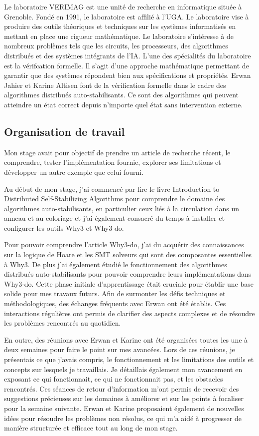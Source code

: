 \documentclass[11pt]{article}
\begin{document}
   Le laboratoire VERIMAG est une unité de recherche en informatique située à Grenoble. Fondé
en 1991, le laboratoire est affilié à l’UGA. Le laboratoire vise à produire des outils théoriques
et techniques sur les systèmes informatisés en mettant en place une rigueur mathématique.
Le laboratoire s'intéresse à  de nombreux problèmes tels que les circuits, les processeurs, des algorithmes distribués et des systèmes intégrants de l’IA.
L’une des spécialités du laboratoire est la vérifcation formelle. Il s’agit d’une approche
mathématique permettant de garantir que des systèmes répondent bien aux spécifications
et propriétés. Erwan Jahier et Karine Altisen font de la vérification formelle dans le 
cadre des algorithmes distribués auto-stabilisants. Ce sont des algorithmes qui peuvent 
atteindre un état correct depuis n'importe quel état sans intervention externe.


\subsection{Organisation de travail}
\label{sec:orgffca747}

Mon stage avait pour objectif de prendre un article de recherche récent, le comprendre, tester l’implémentation fournie, 
explorer ses limitations et développer un autre exemple que celui fourni. 

Au début de mon stage, j'ai commencé par lire le livre Introduction to Distributed Self-Stabilizing Algorithms pour comprendre le domaine des algorithmes auto-stabilisants, 
en particulier ceux liés à la circulation dans un anneau et au coloriage et j'ai également consacré du temps à installer et configurer les outils Why3 et Why3-do.  

Pour pouvoir comprendre l'article Why3-do, j'ai du acquérir des connaissances sur la logique de Hoare et les SMT solveurs qui sont des composantes essentielles à Why3.
De plus j'ai également étudié le fonctionnement des algorithmes distribués auto-stabilisants pour pouvoir comprendre leurs implémentations dans Why3-do.
Cette phase initiale d'apprentissage était cruciale pour établir une base solide pour mes travaux futurs. 
Afin de surmonter les défis techniques et méthodologiques, des échanges fréquents avec Erwan ont été établis. 
Ces interactions régulières ont permis de clarifier des aspects complexes et de résoudre les problèmes rencontrés au quotidien.

En outre, des réunions avec Erwan et Karine ont été organisées toutes les une à deux semaines pour faire le point sur mes avancées. 
Lors de ces réunions, je présentais ce que j'avais compris, le fonctionnement et les limitations des outils et concepts sur lesquels je travaillais. 
Je détaillais également mon avancement en exposant ce qui fonctionnait, ce qui ne fonctionnait pas, et les obstacles rencontrés. 
Ces séances de retour d'information m'ont permis de recevoir des suggestions précieuses sur les domaines à améliorer 
et sur les points à focaliser pour la semaine suivante. Erwan et Karine proposaient également de nouvelles idées pour résoudre les problèmes non résolus,
 ce qui m'a aidé à progresser de manière structurée et efficace tout au long de mon stage.
\end{document}
